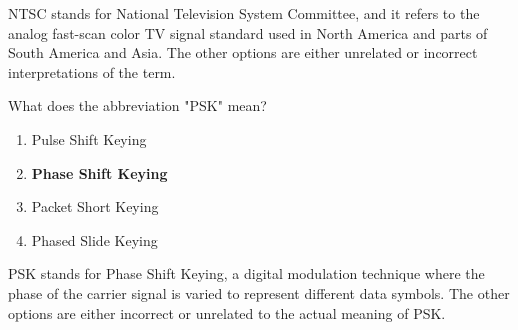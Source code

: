 NTSC stands for National Television System Committee, and it refers to the analog fast-scan color TV signal standard used in North America and parts of South America and Asia. The other options are either unrelated or incorrect interpretations of the term.

\begin{tcolorbox}[colback=gray!10!white,colframe=black!75!black,title={T8D06}]
What does the abbreviation "PSK" mean?
\begin{enumerate}[label=\Alph*),noitemsep]
    \item Pulse Shift Keying
    \item \textbf{Phase Shift Keying}
    \item Packet Short Keying
    \item Phased Slide Keying
\end{enumerate}
\end{tcolorbox}

PSK stands for Phase Shift Keying, a digital modulation technique where the phase of the carrier signal is varied to represent different data symbols. The other options are either incorrect or unrelated to the actual meaning of PSK.

